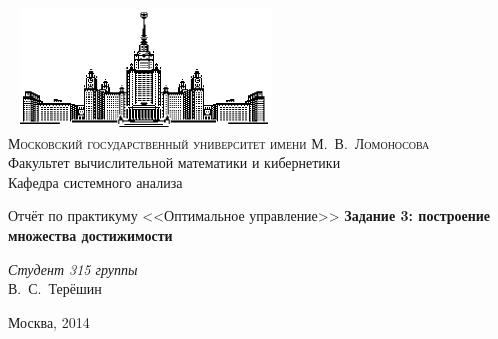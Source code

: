 \documentclass[11pt]{article}
\begin{document}
\thispagestyle{empty}

\begin{center}
\ \vspace{-3cm} \newline
\includegraphics[width=0.5\textwidth]{msu.eps}\\
{\scshape Московский государственный университет имени М.~В.~Ломоносова}\\
Факультет вычислительной математики и кибернетики\\
Кафедра системного анализа

\vfill

{\LARGE Отчёт по практикуму <<Оптимальное управление>>} \newline
{\Huge\bfseries Задание 3: построение множества достижимости}
\end{center}

\vspace{1cm}
\begin{flushright}
\large
\textit{Студент 315 группы}\\
В.~С.~Терёшин\\
\end{flushright}

\vfill
\begin{center}
Москва, 2014
\end{center}
\pagebreak
\tableofcontents
\pagebreak
\end{document}
